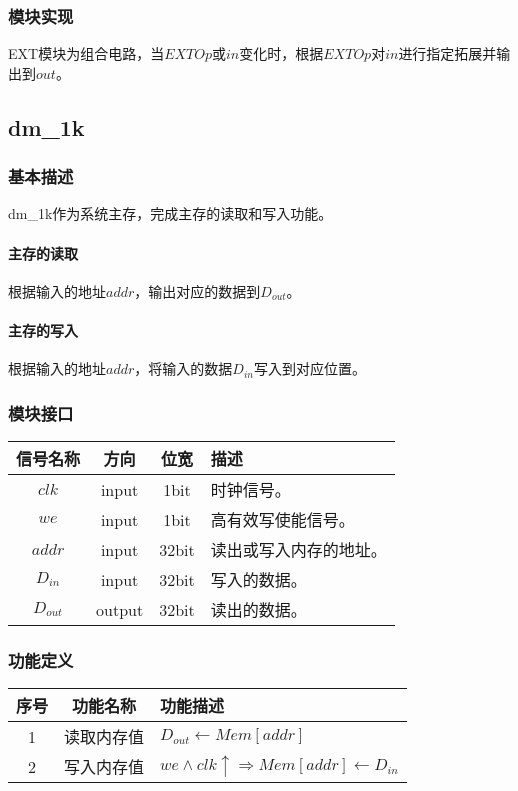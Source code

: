 \documentclass[main.tex]{subfiles}
\begin{document}
\subsubsection{模块实现}
EXT模块为组合电路，当$EXTOp$或$in$变化时，根据$EXTOp$对$in$进行指定拓展并输出到$out$。

\clearpage \subsection{dm\_1k}
\subsubsection{基本描述}
dm\_1k作为系统主存，完成主存的读取和写入功能。
\paragraph{主存的读取}
根据输入的地址$addr$，输出对应的数据到$D_{out}$。
\paragraph{主存的写入}
根据输入的地址$addr$，将输入的数据$D_{in}$写入到对应位置。

\subsubsection{模块接口}
\begin{center}
    \begin{tabular}[]{c c c l}
        \toprule
        信号名称 & 方向 & 位宽 & 描述 \\
        \midrule
        $clk$ & input & 1bit & 时钟信号。\\
        $we$ & input & 1bit & 高有效写使能信号。\\
        \midrule
        $addr$ & input & 32bit & 读出或写入内存的地址。\\
        $D_{in}$ & input & 32bit & 写入的数据。 \\
        $D_{out}$ & output & 32bit & 读出的数据。\\
        \bottomrule
    \end{tabular}
\end{center}

\subsubsection{功能定义}
\begin{center}
    \begin{tabular}{c c l}
        \toprule
        序号 & 功能名称 & 功能描述 \\
        \midrule
        1 & 读取内存值 & $ D_{out} \leftarrow Mem[addr] $ \\
        2 & 写入内存值 & $ we \land clk\uparrow \Rightarrow Mem[addr] \leftarrow D_{in}$ \\
        \bottomrule
    \end{tabular}
\end{center}
\end{document}
